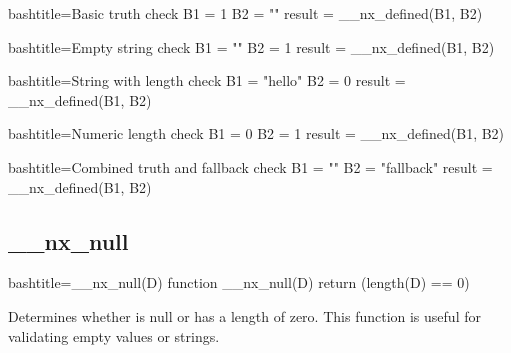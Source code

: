 \begin{NexCodeBox}{bash}{title={Basic truth check}}
	B1 = 1
	B2 = ""
	result = __nx_defined(B1, B2)
\end{NexCodeBox}

\begin{NexCodeBox}{bash}{title={Empty string check}}
	B1 = ""
	B2 = 1
	result = __nx_defined(B1, B2)
\end{NexCodeBox}

\begin{NexCodeBox}{bash}{title={String with length check}}
	B1 = "hello"
	B2 = 0
	result = __nx_defined(B1, B2)
\end{NexCodeBox}

\begin{NexCodeBox}{bash}{title={Numeric length check}}
	B1 = 0
	B2 = 1
	result = __nx_defined(B1, B2)
\end{NexCodeBox}

\begin{NexCodeBox}{bash}{title={Combined truth and fallback check}}
	B1 = ""
	B2 = "fallback"
	result = __nx_defined(B1, B2)
\end{NexCodeBox}

\newpage
\subsection{__nx_null}
\label{__nx_null}
\begin{NexCodeBox}{bash}{title={__nx_null(D)}}
function __nx_null(D) {
	return (length(D) == 0)
}
\end{NexCodeBox}

\begin{NexMainBox}
	\begin{NexMainBox}
		Determines whether  is null or has a length of zero. This function is useful for validating empty values or strings.
	\end{NexMainBox}
	\begin{NexMainBox}
		\begin{NexListDark}
		\end{NexListDark}
	\end{NexMainBox}
\end{NexMainBox}

